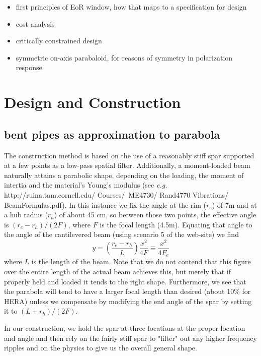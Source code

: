 \documentclass[preprint]{aastex}  %
\begin{document}
\begin{itemize}
\item first principles of EoR window, how that maps to a specification for design
\item cost analysis
\item critically constrained design
\item symmetric on-axis parabaloid, for reasons of symmetry in polarization response
\end{itemize}

\section{Design and Construction}
\label{sec:design}

\subsection{bent pipes as approximation to parabola}
The construction method is based on the use of a reasonably stiff spar supported at a few points as a low-pass spatial filter.  Additionally, a moment-loaded beam naturally attains a parabolic shape, depending on the loading, the moment of intertia and the material's Young's modulus (see {\em e.g.} http://ruina.tam.cornell.edu/ Courses/~ME4730/ Rand4770 Vibrations/ BeamFormulas.pdf).  In this instance we fix the angle at the rim ($r_e$) of 7m and at a hub radius ($r_h$) of about 45 cm, so between those two points, the effective angle is $(r_e-r_h)/(2F)$, where $F$ is the focal length (4.5m).  Equating that angle to the angle of the cantilevered beam (using scenario 5 of the web-site) we find
\begin{equation}
y = \left(\frac{r_e-r_h}{L}\right)\frac{x^2}{4F} \equiv  \frac{x^2}{4F_e}
\end{equation}
where $L$ is the length of the beam.
Note that we do not contend that this figure over the entire length of the actual beam achieves this, but merely that if properly held and loaded it tends to the right shape.  Furthermore, we see that the parabola will tend to have a larger focal length than desired (about 10\% for HERA) unless we compensate by modifying the end angle of the spar by setting it to $(L+r_h)/(2F)$.

In our construction, we hold the spar at three locations at the proper location and angle and then rely on the fairly stiff spar to "filter" out any higher frequency ripples and on the physics to give us the overall general shape.
\end{document}

